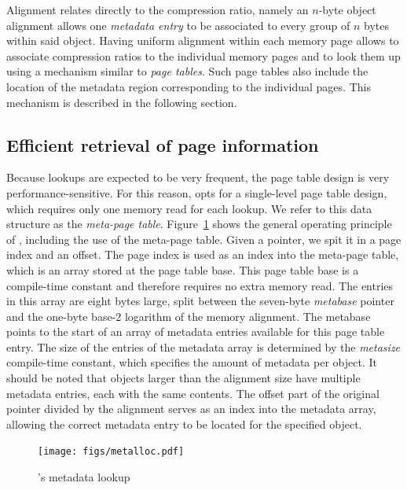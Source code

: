 Alignment relates directly to the compression ratio, namely an $n$-byte object
alignment allows one \emph{metadata entry} to be associated to every group of $n$ bytes
within said object. Having uniform alignment within each memory page allows 
\projectname{} to associate compression ratios to the individual memory
pages and to look them up using a mechanism similar to \emph{page tables}. Such page tables
also include the location of the metadata region corresponding to the individual pages.
This mechanism is described in the following section.

\subsection{Efficient retrieval of page information}
\label{sec:pageinfo}

Because lookups are expected to be very frequent, the page table design is very
performance-sensitive. For this reason, \projectname{} opts for a single-level page table design,
which requires only one memory read for each lookup. We refer to this data structure as the
\emph{meta-page table}. 
Figure~\ref{fig:metalloc} shows the general operating principle of \projectname{},
including the use of the meta-page table.
Given a pointer, we spit it in a page index and an offset.
The page index is used as an index into the meta-page table,
which is an array stored at the page table base.
This page table base is a compile-time constant and therefore requires no extra memory read.
The entries in this array are eight bytes large, split between the seven-byte \emph{metabase} pointer and
the one-byte base-2 logarithm of the memory alignment.
The metabase points to the start of an array of metadata entries
available for this page table entry.
The size of the entries of the metadata array is determined by the \emph{metasize}
compile-time constant, which specifies the amount of metadata per object.
It should be noted that objects larger than the alignment size have multiple
metadata entries, each with the same contents.
The offset part of the original pointer divided by the alignment serves
as an index into the metadata array, allowing the correct metadata entry to be
located for the specified object.

\begin{figure}[t]
\center
  \texttt{[image: figs/metalloc.pdf]}
  \caption{
  \projectname{}'s metadata lookup
  }
  \label{fig:metalloc}
  \vspace{-1em}
\end{figure}

